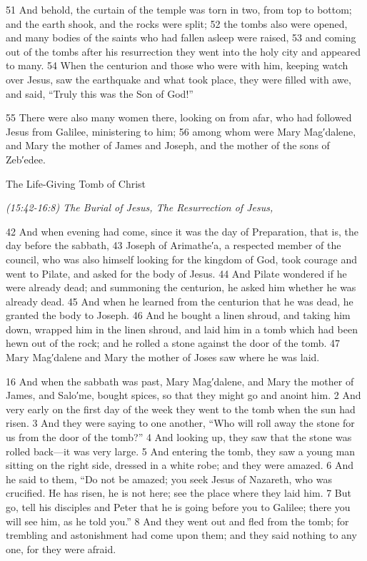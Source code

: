 \documentclass[letterpaper]{report}
\begin{document}
\begin{multicols}{2}
51 And behold, the curtain of the temple was torn in two, from top to bottom; and the earth shook, and the rocks were split; 52 the tombs also were opened, and many bodies of the saints who had fallen asleep were raised, 53 and coming out of the tombs after his resurrection they went into the holy city and appeared to many. 54 When the centurion and those who were with him, keeping watch over Jesus, saw the earthquake and what took place, they were filled with awe, and said, “Truly this was the Son of God!”

55 There were also many women there, looking on from afar, who had followed Jesus from Galilee, ministering to him; 56 among whom were Mary Mag′dalene, and Mary the mother of James and Joseph, and the mother of the sons of Zeb′edee.
\end{multicols}

{\centering
	The Life-Giving Tomb of Christ
	
	\emph{(15:42-16:8) The Burial of Jesus,
		The Resurrection of Jesus,}\\
}
\begin{multicols}{2}
42 And when evening had come, since it was the day of Preparation, that is, the day before the sabbath, 43 Joseph of Arimathe′a, a respected member of the council, who was also himself looking for the kingdom of God, took courage and went to Pilate, and asked for the body of Jesus. 44 And Pilate wondered if he were already dead; and summoning the centurion, he asked him whether he was already dead. 45 And when he learned from the centurion that he was dead, he granted the body to Joseph. 46 And he bought a linen shroud, and taking him down, wrapped him in the linen shroud, and laid him in a tomb which had been hewn out of the rock; and he rolled a stone against the door of the tomb. 47 Mary Mag′dalene and Mary the mother of Joses saw where he was laid.

16 And when the sabbath was past, Mary Mag′dalene, and Mary the mother of James, and Salo′me, bought spices, so that they might go and anoint him. 2 And very early on the first day of the week they went to the tomb when the sun had risen. 3 And they were saying to one another, “Who will roll away the stone for us from the door of the tomb?” 4 And looking up, they saw that the stone was rolled back—it was very large. 5 And entering the tomb, they saw a young man sitting on the right side, dressed in a white robe; and they were amazed. 6 And he said to them, “Do not be amazed; you seek Jesus of Nazareth, who was crucified. He has risen, he is not here; see the place where they laid him. 7 But go, tell his disciples and Peter that he is going before you to Galilee; there you will see him, as he told you.” 8 And they went out and fled from the tomb; for trembling and astonishment had come upon them; and they said nothing to any one, for they were afraid.
\end{multicols}
\end{document}
